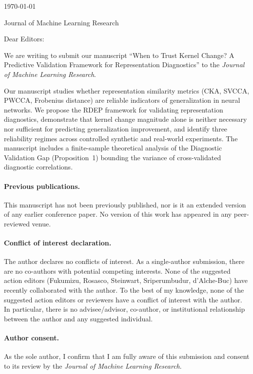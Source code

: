 


\hfill{\today}

Journal of Machine Learning Research

\bigskip

Dear Editors:

We are writing to submit our manuscript ``When to Trust Kernel Change? A Predictive Validation Framework for Representation Diagnostics'' to the \emph{Journal of Machine Learning Research}.

Our manuscript studies whether representation similarity metrics (CKA, SVCCA, PWCCA, Frobenius distance) are reliable indicators of generalization in neural networks. We propose the RDEP framework for validating representation diagnostics, demonstrate that kernel change magnitude alone is neither necessary nor sufficient for predicting generalization improvement, and identify three reliability regimes across controlled synthetic and real-world experiments. The manuscript includes a finite-sample theoretical analysis of the Diagnostic Validation Gap (Proposition~1) bounding the variance of cross-validated diagnostic correlations.

\paragraph{Previous publications.} This manuscript has not been previously published, nor is it an extended version of any earlier conference paper. No version of this work has appeared in any peer-reviewed venue.

\paragraph{Conflict of interest declaration.} The author declares no conflicts of interest. As a single-author submission, there are no co-authors with potential competing interests. None of the suggested action editors (Fukumizu, Rosasco, Steinwart, Sriperumbudur, d'Alche-Buc) have recently collaborated with the author. To the best of my knowledge, none of the suggested action editors or reviewers have a conflict of interest with the author. In particular, there is no advisee/advisor, co-author, or institutional relationship between the author and any suggested individual.

\paragraph{Author consent.} As the sole author, I confirm that I am fully aware of this submission and consent to its review by the \emph{Journal of Machine Learning Research}.

